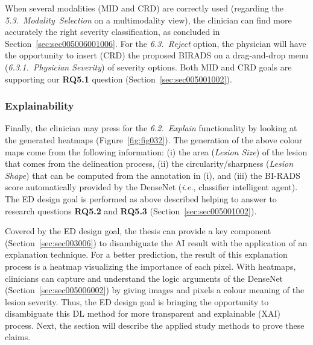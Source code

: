 When several modalities (\ac{MID} and \ac{CRD}) are correctly used (regarding the {\it 5.3.~Modality~Selection} on a multimodality view), the clinician can find more accurately the right severity classification, as concluded in Section~\ref{sec:sec005006001006}.
For the {\it 6.3.~Reject} option, the physician will have the opportunity to insert (\ac{CRD}) the proposed BIRADS on a drag-and-drop menu ({\it 6.3.1.~Physician Severity}) of severity options. Both \ac{MID} and \ac{CRD} goals are supporting our {\bf RQ5.1} question (Section~\ref{sec:sec005001002}).

\subsubsection{Explainability}
\label{sec:sec005004002002}

Finally, the clinician may press for the {\it 6.2.~Explain} functionality  by looking at the generated heatmaps (Figure~\ref{fig:fig032}).
The generation of the above colour maps come from the following information: (i) the area ({\it Lesion Size}) of the lesion that comes from the delineation process, (ii) the circularity/sharpness ({\it Lesion Shape}) that can be computed from the annotation in (i), and (iii) the BI-RADS score automatically provided by the DenseNet ({\it i.e.}, classifier intelligent agent).
The \ac{ED} design goal is performed as above described helping to answer to research questions {\bf RQ5.2} and {\bf RQ5.3} (Section~\ref{sec:sec005001002}).

Covered by the \ac{ED} design goal, the thesis can provide a key component (Section~\ref{sec:sec003006}) to disambiguate the \ac{AI} result with the application of an explanation technique.
For a better prediction, the result of this explanation process is a heatmap visualizing the importance of each pixel.
With heatmaps, clinicians can capture and understand the logic arguments of the DenseNet (Section~\ref{sec:sec005006002}) by giving images and pixels a colour meaning of the lesion severity.
Thus, the \ac{ED} design goal is bringing the opportunity to disambiguate this \ac{DL} method for more transparent and explainable (\ac{XAI}) process.
Next, the section will describe the applied study methods to prove these claims.


